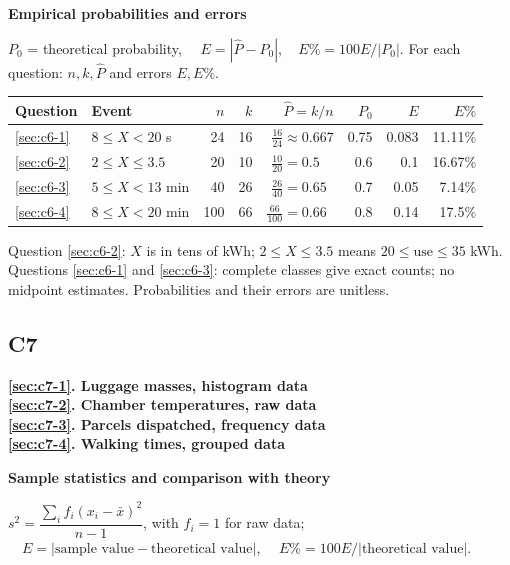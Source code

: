 {\begin{minipage}{\linewidth}
\textbf{Empirical probabilities and errors}

$P_0$ = theoretical probability, $\quad E=|\widehat P-P_0|,\quad
E\%=100E/|P_0|$.
For each question: $n,k,\widehat P$ and errors $E,E\%$.

\par\smallskip
\begin{tabularx}{\linewidth}{@{}l >{\raggedright\arraybackslash}X rr r r r r@{}}
\toprule
Question & Event & $n$ & $k$ & $\widehat P=k/n$ & $P_0$ & $E$ & $E\%$ \\
\midrule
\ref{sec:c6-1} & $8\le X<20$ s & 24 & 16 & $\frac{16}{24}\approx0.667$ & 0.75\phantom{0} & 0.083 & 11.11\% \\
\ref{sec:c6-2} & $2\le X\le3.5$ & 20 & 10 & $\frac{10}{20}=0.5\phantom{00}$ & 0.6\phantom{00} & 0.1\phantom{00} & 16.67\% \\
\ref{sec:c6-3} & $5\le X<13$ min & 40 & 26 & $\frac{26}{40}=0.65\phantom{0}$ & 0.7\phantom{00} & 0.05\phantom{0} & 7.14\% \\
\ref{sec:c6-4} & $8\le X<20$ min & 100 & 66 & $\frac{66}{100}=0.66\phantom{0}$ & 0.8\phantom{00} & 0.14\phantom{0} & 17.5\phantom{0}\% \\
\bottomrule
\end{tabularx}
\par\smallskip

Question \ref{sec:c6-2}: $X$ is in tens of kWh; $2\le X\le3.5$ means $20\le\text{use}\le35$ kWh.
Questions \ref{sec:c6-1} and \ref{sec:c6-3}: complete classes give exact counts; no midpoint estimates.
Probabilities and their errors are unitless.
\end{minipage}

\newpage
\begin{minipage}{\linewidth}
\subsection*{C7}
\textbf{\ref{sec:c7-1}. Luggage masses, histogram data}\\
\textbf{\ref{sec:c7-2}. Chamber temperatures, raw data}\\
\textbf{\ref{sec:c7-3}. Parcels dispatched, frequency data}\\
\textbf{\ref{sec:c7-4}. Walking times, grouped data}

\textbf{Sample statistics and comparison with theory}

$s^2=\dfrac{\sum_i f_i(x_i-\bar{x})^2}{n-1}$, with $f_i=1$ for raw data;
$\quad E=|\text{sample value}-\text{theoretical value}|$, $\quad
E\%=100E/|\text{theoretical value}|$.


\end{minipage}}
